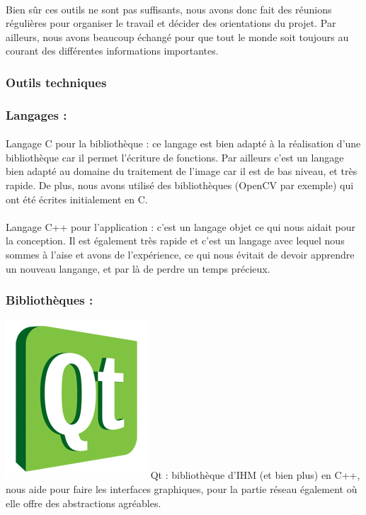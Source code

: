 \documentclass{report}
\begin{document}
			\paragraph{} Bien sûr ces outils ne sont pas suffisants, nous avons donc fait des réunions régulières pour organiser le travail et décider des orientations du projet. Par ailleurs, nous avons beaucoup échangé pour que tout le monde soit toujours au courant des différentes informations importantes.
			
			\subsubsection{Outils techniques}
			\subsubsection{Langages :}
			\paragraph{} Langage C pour la bibliothèque : ce langage est bien adapté à la réalisation d'une bibliothèque car il permet l'écriture de fonctions. Par ailleurs c'est un langage bien adapté au domaine du traitement de l'image car il est de bas niveau, et très rapide. De plus, nous avons utilisé des bibliothèques (OpenCV par exemple) qui ont été écrites initialement en C.
			\paragraph{} Langage C++ pour l'application : c'est un langage objet ce qui nous aidait pour la conception. Il est également très rapide et c'est un langage avec lequel nous sommes à l'aise et avons de l'expérience, ce qui nous évitait de devoir apprendre un nouveau langange, et par là de perdre un temps précieux.\\
			
			\subsubsection{Bibliothèques :}
			\includegraphics[scale=0.15]{../logos/qt_logo.png}
			Qt : bibliothèque d'IHM (et bien plus) en C++, nous aide pour faire les interfaces graphiques, pour la partie réseau également où elle offre des abstractions agréables. \\
\end{document}
